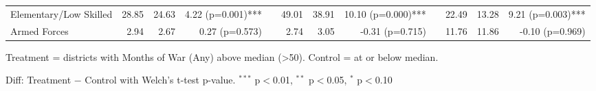 \begin{table}[htbp]
\begin{tabular}{l rrr c rrr c rrr}
\quad Elementary/Low Skilled & 28.85 & 24.63 & 4.22 (p=0.001)*** &  & 49.01 & 38.91 & 10.10 (p=0.000)*** &  & 22.49 & 13.28 & 9.21 (p=0.003)*** \\
\quad Armed Forces & 2.94 & 2.67 & 0.27 (p=0.573) &  & 2.74 & 3.05 & -0.31 (p=0.715) &  & 11.76 & 11.86 & -0.10 (p=0.969) \\
\bottomrule
\end{tabular}
\begin{tablenotes}
\small
\item Treatment = districts with Months of War (Any) above median (>50). Control = at or below median.
\item Diff: Treatment $-$ Control with Welch's t-test p-value. $^{{***}}$ p$<$0.01, $^{{**}}$ p$<$0.05, $^{{*}}$ p$<$0.10
\end{tablenotes}
\end{table}

\clearpage

